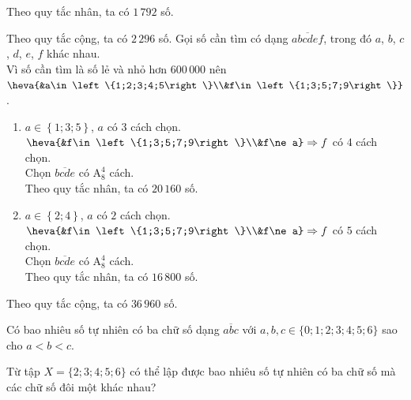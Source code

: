 \begin{ex}
{\begin{itemchoice}
\begin{enumerate}
				Theo quy tắc nhân, ta  có $1\,792$ số.
			\end{enumerate}
			Theo  quy tắc cộng, ta có $2\,296$ số.
			 \itemch
			Gọi số cần tìm có dạng $\overline{abcdef}$, trong đó $a$, $b$, $c$, $d$, $e$, $f$  khác nhau.\\
			Vì số cần  tìm là số lẻ và nhỏ hơn $600\,000$ nên $\heva{&a\in \left\{1;2;3;4;5\right\}\\&f\in \left\{1;3;5;7;9\right\}}$.
			\begin{enumerate}
				\item $a\in \left\{1;3;5\right\}$, $a$ có $3$  cách chọn.\\
				$\heva{&f\in \left\{1;3;5;7;9\right\}\\&f\ne a} \Rightarrow f$  có $4$ cách chọn.\\
				 Chọn $\overline{bcde}$ có $\mathrm{A}_8^4$ cách.\\
				Theo quy tắc  nhân, ta có $20\,160$ số.
				\item $a\in \left\{2;4\right\}$, $a$ có $2$ cách  chọn.\\
				$\heva{&f\in \left\{1;3;5;7;9\right\}\\&f\ne  a} \Rightarrow f$ có $5$ cách chọn.\\
				Chọn $\overline{bcde}$  có $\mathrm{A}_8^4$ cách.\\
				Theo quy tắc nhân,  ta có $16\,800$ số.
			\end{enumerate}
			Theo quy tắc cộng, ta có  $36\,960$ số.
		\end{itemchoice}
	 }
\end{ex}



\begin{bt}%
	Có bao nhiêu số tự nhiên có ba chữ số dạng $\overline{a b c}$ với $a, b, c \in\{0; 1;  2; 3; 4; 5; 6\}$ sao cho $a<b<c$.
\end{bt}

\begin{bt}%
	Từ tập $X=\{2; 3; 4; 5; 6\}$ có thể lập được bao nhiêu số tự nhiên có ba chữ số mà các chữ  số đôi một khác nhau?
\end{bt}

